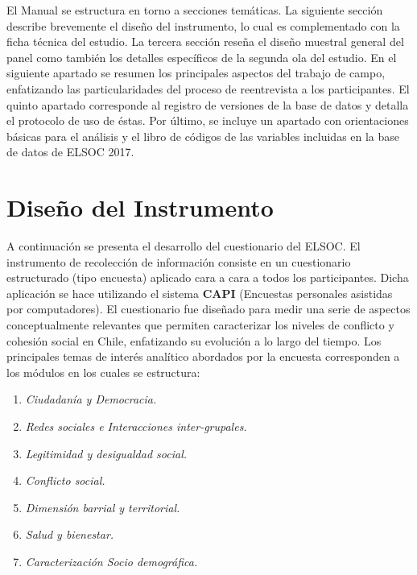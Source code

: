 \documentclass[12pt]{report}
\begin{document}
El Manual se estructura en torno a secciones temáticas. La siguiente sección describe brevemente el diseño del instrumento, lo cual es complementado con la ficha técnica del estudio. La tercera sección reseña el diseño muestral general del panel como también los detalles específicos de la segunda ola del estudio. En el siguiente apartado se resumen los principales aspectos del trabajo de campo, enfatizando las particularidades del proceso de reentrevista a los participantes. El quinto apartado corresponde al registro de versiones de la base de datos y detalla el protocolo de uso de éstas.  Por último, se incluye un apartado con orientaciones básicas para el análisis y el libro de códigos de las variables incluidas en la base de datos de ELSOC 2017. 

	
\newpage
\section*{Diseño del Instrumento}

A continuación se presenta el desarrollo del cuestionario del ELSOC. El instrumento de recolección de información consiste en un cuestionario estructurado (tipo encuesta) aplicado cara a cara a todos los participantes. Dicha aplicación se hace utilizando el sistema \textbf{CAPI} (Encuestas personales asistidas por computadores). El cuestionario fue diseñado para medir una serie de aspectos conceptualmente  relevantes que permiten caracterizar los niveles  de conflicto y cohesión social en Chile, enfatizando su evolución a lo largo del tiempo. Los principales temas de interés analítico abordados por la encuesta corresponden a los módulos en los cuales se estructura:

\begin{enumerate}
\item \textit{Ciudadanía y Democracia.}  
\item \textit{Redes sociales e Interacciones inter-grupales.} 
\item \textit{Legitimidad y desigualdad social.}
\item \textit{Conflicto social.}
\item \textit{Dimensión barrial y territorial.}
\item \textit{Salud y bienestar.}
\item \textit{Caracterización Socio demográfica.}
\end{enumerate}
\end{document}
